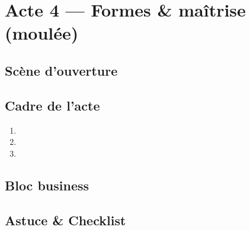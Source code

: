 \documentclass[../../main.tex]{subfiles}
\begin{document}
\chapter{Acte 4 — Formes & maîtrise (moulée)}

\begin{Hook}
\end{Hook}

\section*{Scène d'ouverture}

\section{Cadre de l'acte}
\begin{BlocObjectif}
\end{BlocObjectif}

\spacer

\begin{BlocMateriel}
\end{BlocMateriel}

\spacer

\begin{BlocEtapes}
\begin{enumerate}
  \item 
  \item 
  \item 
\end{enumerate}
\end{BlocEtapes}

\spacer

\begin{BlocControles}
\end{BlocControles}

\spacer

\begin{BlocDepannage}
\end{BlocDepannage}

\section{Bloc business}
\begin{BlocCouts}
\end{BlocCouts}

\spacer

\begin{BlocAVendre}
\end{BlocAVendre}

\section*{Astuce \& Checklist}
\begin{BlocAstuce}
\end{BlocAstuce}

\spacer

\begin{BlocChecklist}
\end{BlocChecklist}
\end{document}

